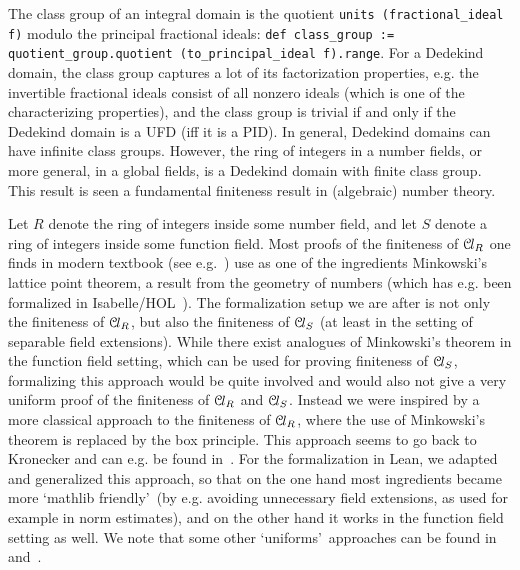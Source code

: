 \documentclass[a4paper,USenglish,cleveref, autoref, thm-restate]{lipics-v2021}
\newcommand{\lean}[1]{\texttt{#1}\xspace} %
\newcommand*{\Cl}{\mathcal{C}\kern-.075em l}
\begin{document}
The class group of an integral domain is the quotient \lean{units (fractional\_ideal f)} modulo the principal fractional ideals:
\lean{def class\_group := quotient\_group.quotient (to\_principal\_ideal f).range}.
For a Dedekind domain, the class group captures a lot of its factorization properties, e.g. the invertible fractional ideals consist of all nonzero ideals (which is one of the characterizing properties), and the class group is trivial if and only if the Dedekind domain is a UFD (iff it is a PID).
In general, Dedekind domains can have infinite class groups. However, the ring of integers in a number fields, or more general, in a global fields, is a Dedekind domain with finite class group. This result is seen a fundamental finiteness result in (algebraic) number theory.

Let $R$ denote the ring of integers inside some number field, and let $S$ denote a ring of integers inside some function field.
Most proofs of the finiteness of $\Cl_R$ one finds in modern textbook (see e.g.~\cite[Theorems 4.4, 5.3, 6.3]{Neukirch}) use as one of the ingredients Minkowski's lattice point theorem, a result from the geometry of numbers (which has e.g. been formalized in Isabelle/HOL~\cite{Minkowskis_Theorem-AFP}). 
The formalization setup we are after is not only the finiteness of $\Cl_R$, but also the finiteness of $\Cl_S$ (at least in the setting of separable field extensions).
While there exist analogues of Minkowski's theorem in the function field setting, which can be used for proving finiteness of $\Cl_S$, formalizing this approach would be quite involved and would also not give a very uniform proof of the finiteness of $\Cl_R$ and  $\Cl_S$.
Instead we were inspired by a more classical approach to the finiteness of $\Cl_R$, where the use of Minkowski's theorem is replaced by the box principle. This approach seems to go back to Kronecker
and can e.g. be found in~\cite{Ireland-Rosen}. For the formalization in Lean, we adapted and generalized this approach, so that on the one hand most ingredients became more \lq mathlib friendly\rq\ (by e.g. avoiding unnecessary field extensions, as used for example in norm estimates), and on the other hand it works in the function field setting as well.
We note that some other \lq uniforms\rq\ approaches can be found in~\cite{Artin-Whaples} and~\cite{Stasinski}. 
\end{document}
